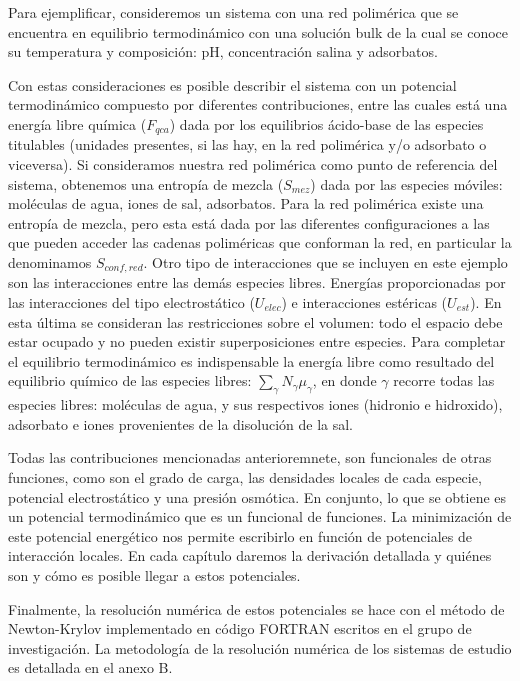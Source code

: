 
Para ejemplificar, consideremos un sistema con una red polim\'erica que se encuentra en equilibrio termodin\'amico con una soluci\'on bulk de la cual se conoce su temperatura y composici\'on: pH, concentraci\'on salina y adsorbatos.

Con estas consideraciones es posible describir el sistema con un potencial termodin\'amico compuesto por diferentes contribuciones, entre las cuales est\'a una energ\'ia libre qu\'imica ($F_{qca}$) dada por los equilibrios \'acido-base de las especies titulables (unidades presentes, si las hay, en la red polim\'erica y/o adsorbato o viceversa).
Si consideramos nuestra red polim\'erica como punto de referencia del sistema, obtenemos una entrop\'ia de mezcla ($S_{mez}$) dada por las especies m\'oviles: mol\'eculas de agua, iones de sal, adsorbatos.
Para la red polim\'erica existe una entrop\'ia de mezcla, pero esta est\'a dada por las diferentes configuraciones a las que pueden acceder las cadenas polim\'ericas que conforman la red, en particular la denominamos $S_{conf,red}$.
Otro tipo de interacciones que se incluyen en este ejemplo son las interacciones entre las dem\'as especies libres. Energ\'ias proporcionadas por las interacciones del tipo electrost\'atico ($U_{elec}$) e interacciones est\'ericas ($U_{est}$). En esta \'ultima se consideran las restricciones sobre el volumen: todo el espacio debe estar ocupado y no pueden existir superposiciones entre especies.
Para completar el equilibrio termodin\'amico es indispensable la energ\'ia libre como resultado del equilibrio qu\'imico de las especies libres: $\sum_\gamma N_\gamma \mu_\gamma$, en donde $\gamma$ recorre todas las especies libres:
mol\'eculas de agua, y sus respectivos iones (hidronio e hidroxido), adsorbato e iones provenientes de la disoluci\'on de la sal.

Todas las contribuciones mencionadas anterioremnete, son funcionales de otras funciones, como son el grado de carga, las densidades locales de cada especie, potencial electrost\'atico y una presi\'on osm\'otica. En conjunto, lo que se obtiene es un potencial termodin\'amico que es un funcional de funciones.
La minimizaci\'on de este potencial energ\'etico nos permite escribirlo en funci\'on de potenciales de interacci\'on locales. En cada cap\'itulo daremos la derivaci\'on detallada y qui\'enes son y c\'omo es posible llegar a estos potenciales.

Finalmente, la resolución num\'erica de estos potenciales se hace con el m\'etodo de Newton-Krylov \cite{brown1994convergence} implementado en c\'odigo FORTRAN escritos en el grupo de investigaci\'on. La metodolog\'ia de la resoluci\'on num\'erica de los sistemas de estudio es detallada en el anexo B.



